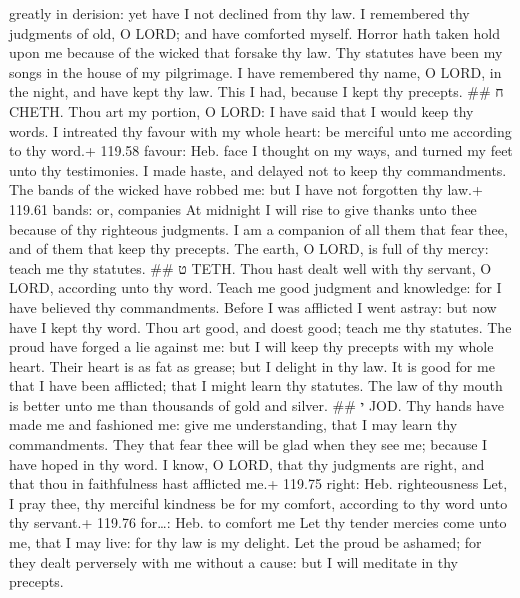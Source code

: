 greatly in derision: yet have I not declined from thy law. 
I remembered thy judgments of old, O LORD; and have comforted myself.
 Horror hath taken hold upon me because of the wicked that
forsake thy law.  Thy statutes have been my songs in the
house of my pilgrimage.  I have remembered thy name, O
LORD, in the night, and have kept thy law.  This I had,
because I kept thy precepts. \#\# ח CHETH.  Thou art my
portion, O LORD: I have said that I would keep thy words. 
I intreated thy favour with my whole heart: be merciful unto me
according to thy word.+ 119.58 favour: Heb. face  I thought
on my ways, and turned my feet unto thy testimonies.  I
made haste, and delayed not to keep thy commandments.  The
bands of the wicked have robbed me: but I have not forgotten thy law.+
119.61 bands: or, companies  At midnight I will rise to
give thanks unto thee because of thy righteous judgments. 
I am a companion of all them that fear thee, and of them that keep thy
precepts.  The earth, O LORD, is full of thy mercy: teach
me thy statutes. \#\# ט TETH.  Thou hast dealt well with
thy servant, O LORD, according unto thy word.  Teach me
good judgment and knowledge: for I have believed thy commandments.
 Before I was afflicted I went astray: but now have I kept
thy word.  Thou art good, and doest good; teach me thy
statutes.  The proud have forged a lie against me: but I
will keep thy precepts with my whole heart.  Their heart is
as fat as grease; but I delight in thy law.  It is good for
me that I have been afflicted; that I might learn thy statutes.
 The law of thy mouth is better unto me than thousands of
gold and silver. \#\# י JOD.  Thy hands have made me and
fashioned me: give me understanding, that I may learn thy commandments.
 They that fear thee will be glad when they see me; because
I have hoped in thy word.  I know, O LORD, that thy
judgments are right, and that thou in faithfulness hast afflicted me.+
119.75 right: Heb. righteousness  Let, I pray thee, thy
merciful kindness be for my comfort, according to thy word unto thy
servant.+ 119.76 for\ldots: Heb. to comfort me  Let thy
tender mercies come unto me, that I may live: for thy law is my delight.
 Let the proud be ashamed; for they dealt perversely with
me without a cause: but I will meditate in thy precepts. 
